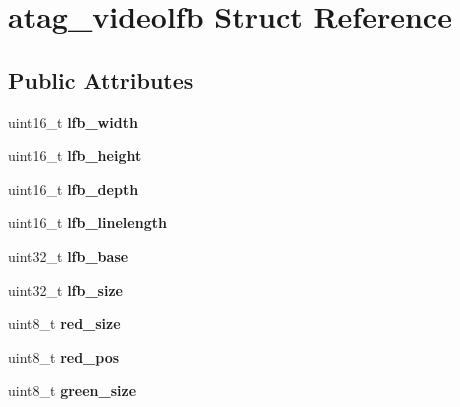 \hypertarget{structatag__videolfb}{}\section{atag\+\_\+videolfb Struct Reference}
\label{structatag__videolfb}
\subsection*{Public Attributes}
\begin{DoxyCompactItemize}
\item 
\mbox{\label{structatag__videolfb_a86eeb94103f68ba2adcc22d1f80dba90}} 
uint16\+\_\+t {\bfseries lfb\+\_\+width}
\item 
\mbox{\label{structatag__videolfb_aa25cd602f991d91b97383268c4ba8c44}} 
uint16\+\_\+t {\bfseries lfb\+\_\+height}
\item 
\mbox{\label{structatag__videolfb_a89a2319792bf64d09aa7275f2bb577b0}} 
uint16\+\_\+t {\bfseries lfb\+\_\+depth}
\item 
\mbox{\label{structatag__videolfb_ab93ead90bfb00a2b2645d6bff3fe0b88}} 
uint16\+\_\+t {\bfseries lfb\+\_\+linelength}
\item 
\mbox{\label{structatag__videolfb_af9455e0fff99ee25304cff66216252f7}} 
uint32\+\_\+t {\bfseries lfb\+\_\+base}
\item 
\mbox{\label{structatag__videolfb_a691f80293cd56a98e270585c1a4c200b}} 
uint32\+\_\+t {\bfseries lfb\+\_\+size}
\item 
\mbox{\label{structatag__videolfb_a143c9a6ed286e38ddfa3c775da9ac6e2}} 
uint8\+\_\+t {\bfseries red\+\_\+size}
\item 
\mbox{\label{structatag__videolfb_a276973ee02f55518c07a36378013ab2e}} 
uint8\+\_\+t {\bfseries red\+\_\+pos}
\item 
\mbox{\label{structatag__videolfb_a169cd1bf8fcd7350d1096ed0be79c607}} 
uint8\+\_\+t {\bfseries green\+\_\+size}

\end{DoxyCompactItemize}
